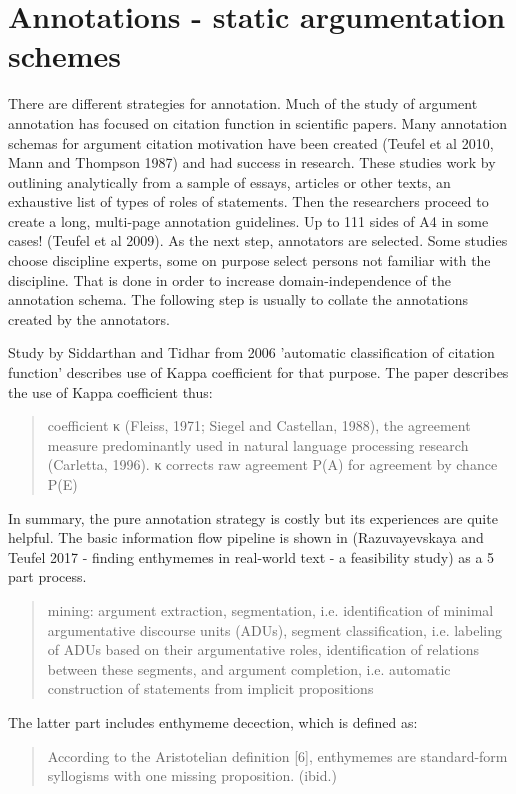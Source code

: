 \documentclass{article}
\begin{document}
\section{Annotations - static argumentation schemes}
There are different strategies for annotation. Much of the study of argument annotation has focused on citation function in scientific papers.
Many annotation schemas for argument citation motivation have been created (Teufel et al 2010, Mann and Thompson 1987) and had success in research.
These studies work by outlining analytically from a sample of essays, articles or other texts, an exhaustive list of types of roles of statements.
Then the researchers proceed to create a long, multi-page annotation guidelines. Up to 111 sides of A4 in some cases! (Teufel et al 2009).
As the next step, annotators are selected. Some studies choose discipline experts, some on purpose select persons not familiar with the discipline.
That is done in order to increase domain-independence of the annotation schema.
The following step is usually to collate the annotations created by the annotators. 

Study by Siddarthan and Tidhar from 2006 'automatic classification of citation function' describes use of Kappa coefficient for that purpose.
The paper describes the use of Kappa coefficient thus:
\begin{quote}
  coefficient κ (Fleiss, 1971; Siegel and Castellan, 1988), the agreement measure predominantly used in natural language processing research (Carletta, 1996). κ corrects raw agreement P(A) for agreement by chance P(E)
\end{quote}

In summary, the pure annotation strategy is costly but its experiences are quite helpful. The basic information flow pipeline is shown in (Razuvayevskaya and Teufel 2017 - finding enthymemes in real-world text - a feasibility study) as a 5 part process.
\begin{quote}
   mining: argument extraction, segmentation, i.e. identification of minimal argumentative discourse units (ADUs), segment classification, i.e. labeling of ADUs based on their argumentative roles, identification of relations between these segments, and argument completion, i.e. automatic construction of statements from implicit propositions
\end{quote}

The latter part includes enthymeme decection, which is defined as:
\begin{quote}
According to the Aristotelian definition [6], enthymemes are standard-form syllogisms with one missing proposition.  (ibid.)
\end{quote}
\end{document}
